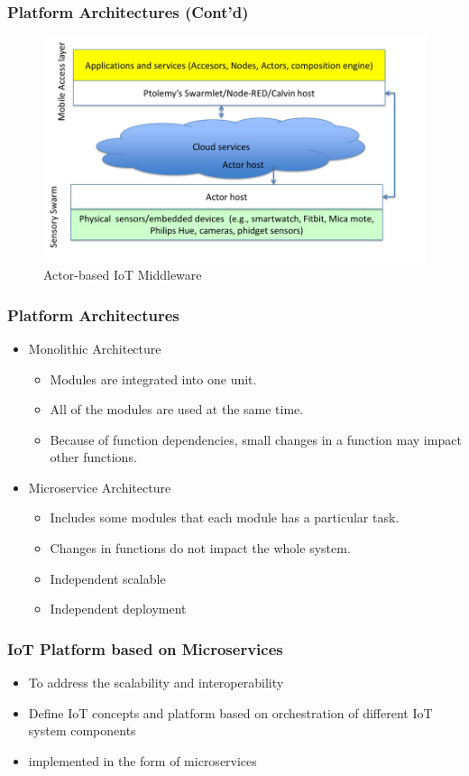\documentclass{../iot-lecture}
\begin{document}
\begin{frame}
  \frametitle{Platform Architectures (Cont'd)}
  \begin{figure}
    \includegraphics[width=\textwidth]{./img/actor-based-iot-middleware.png}
    \caption{Actor-based IoT Middleware}
  \end{figure}
\end{frame}

\begin{frame}
  \frametitle{Platform Architectures}
  \begin{itemize}
    \item Monolithic Architecture
    \begin{itemize}
      \item Modules are integrated into one unit.
      \item All of the modules are used at the same time.
      \item Because of function dependencies, small changes in a function
        may impact other functions.
    \end{itemize}
    \item Microservice Architecture
    \begin{itemize}
      \item Includes some modules that each module has a particular task.
      \item Changes in functions do not impact the whole system.
      \item Independent scalable
      \item Independent deployment
    \end{itemize}
  \end{itemize}
\end{frame}

\begin{frame}
  \frametitle{IoT Platform based on Microservices}
  \begin{itemize}
    \item To address the scalability and interoperability
    \item Define IoT concepts and platform based on orchestration of different IoT system components
    \item implemented in the form of microservices
  \end{itemize}
\end{frame}
\end{document}

